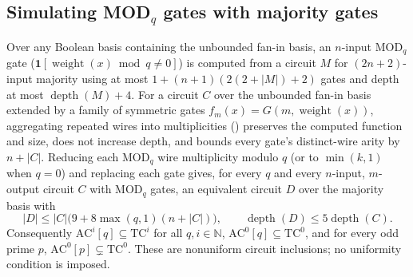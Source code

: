 \begin{result}
\subsection{Simulating \texorpdfstring{MOD$_q$}{MOD\_q} gates with majority gates}
Over any Boolean basis containing the unbounded fan-in basis, an $n$-input
$\mathrm{MOD}_q$ gate ($\mathbf 1[\operatorname{weight}(x)\bmod q\ne0]$) is
computed from a circuit $M$ for $(2n+2)$-input majority using at most
$1+(n+1)(2(2+|M|)+2)$ gates and depth at most $\operatorname{depth}(M)+4$.
For a circuit $C$ over the unbounded fan-in basis extended by a family of
symmetric gates $f_m(x)=G(m,\operatorname{weight}(x))$, aggregating repeated
wires into multiplicities () preserves the computed function
and size, does not increase depth, and bounds every gate's distinct-wire arity
by $n+|C|$. Reducing each $\mathrm{MOD}_q$ wire multiplicity modulo $q$ (or to
$\min(k,1)$ when $q=0$) and replacing each gate gives, for every $q$ and every
$n$-input, $m$-output circuit $C$ with $\mathrm{MOD}_q$ gates, an equivalent
circuit $D$ over the majority basis with
\[
|D|\le |C|\bigl(9+8\max(q,1)(n+|C|)\bigr),\qquad
\operatorname{depth}(D)\le 5\operatorname{depth}(C).
\]
Consequently $\mathrm{AC}^i[q]\subseteq\mathrm{TC}^i$ for all $q,i\in\mathbb N$,
$\mathrm{AC}^0[q]\subseteq\mathrm{TC}^0$, and for every odd prime $p$,
$\mathrm{AC}^0[p]\subsetneq\mathrm{TC}^0$. These are nonuniform circuit
inclusions; no uniformity condition is imposed.\citep{ChandraStockmeyerVishkin1984,Vollmer1999,Razborov1987,Smolensky1987}

\end{result}
